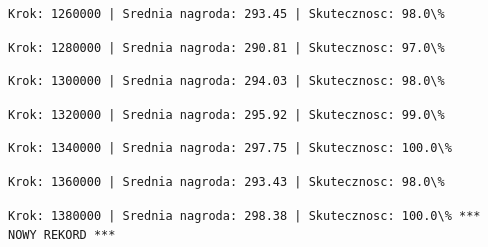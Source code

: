 \documentclass[11pt]{article}
\begin{document}
    
    
    \begin{Verbatim}[commandchars=\\\{\}]
Krok: 1260000 | Srednia nagroda: 293.45 | Skutecznosc: 98.0\%

    \end{Verbatim}

    
    
    \begin{Verbatim}[commandchars=\\\{\}]
Krok: 1280000 | Srednia nagroda: 290.81 | Skutecznosc: 97.0\%

    \end{Verbatim}

    
    
    \begin{Verbatim}[commandchars=\\\{\}]
Krok: 1300000 | Srednia nagroda: 294.03 | Skutecznosc: 98.0\%

    \end{Verbatim}

    
    
    \begin{Verbatim}[commandchars=\\\{\}]
Krok: 1320000 | Srednia nagroda: 295.92 | Skutecznosc: 99.0\%

    \end{Verbatim}

    
    
    \begin{Verbatim}[commandchars=\\\{\}]
Krok: 1340000 | Srednia nagroda: 297.75 | Skutecznosc: 100.0\%

    \end{Verbatim}

    
    
    \begin{Verbatim}[commandchars=\\\{\}]
Krok: 1360000 | Srednia nagroda: 293.43 | Skutecznosc: 98.0\%

    \end{Verbatim}

    
    
    \begin{Verbatim}[commandchars=\\\{\}]
Krok: 1380000 | Srednia nagroda: 298.38 | Skutecznosc: 100.0\% *** NOWY REKORD ***

    \end{Verbatim}
\end{document}
